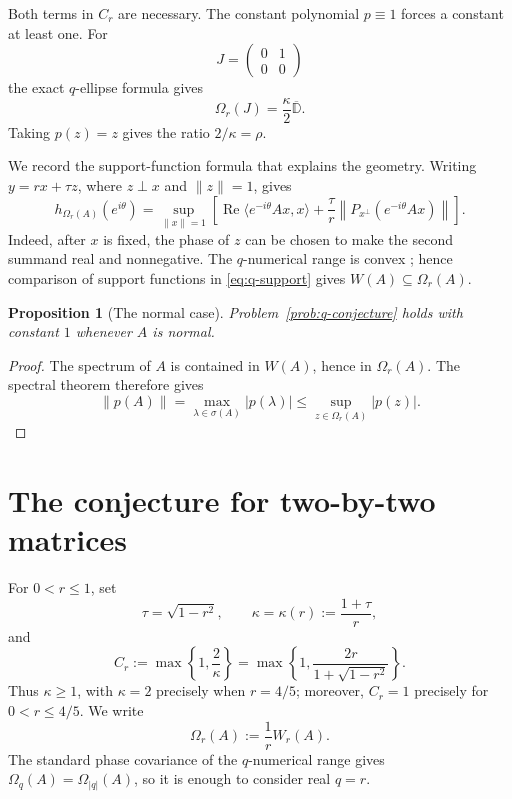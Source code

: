 \documentclass[11pt]{article}
\newtheorem{proposition}[theorem]{Proposition}
\theoremstyle{remark}
\newcommand{\D}{\mathbb D}
\newcommand{\RePart}{\operatorname{Re}}
\begin{document}
Both terms in \(C_r\) are necessary.  The constant polynomial
\(p\equiv1\) forces a constant at least one.  For
\[
 J=\begin{pmatrix}0&1\\0&0\end{pmatrix}
\]
the exact \(q\)-ellipse formula gives
\[
 \Omega_r(J)=\frac{\kappa}{2}\overline{\D}.
\]
Taking \(p(z)=z\) gives the ratio \(2/\kappa=\rho\).

We record the support-function formula that explains the geometry.
Writing \(y=rx+\tau z\), where \(z\perp x\) and \(\|z\|=1\), gives
\begin{equation}
\label{eq:q-support}
 h_{\Omega_r(A)}(e^{i\theta})
 =
 \sup_{\|x\|=1}
 \left[
  \RePart\langle e^{-i\theta}Ax,x\rangle
  +\frac{\tau}{r}
   \left\|P_{x^\perp}(e^{-i\theta}Ax)\right\|
 \right].
\end{equation}
Indeed, after \(x\) is fixed, the phase of \(z\) can be chosen to
make the second summand real and nonnegative.  The \(q\)-numerical
range is convex \cite{LiMehtaRodman1994}; hence comparison of support
functions in \eqref{eq:q-support} gives
\(W(A)\subseteq\Omega_r(A)\).

\begin{proposition}[The normal case]
\label{prop:normal}
Problem~\ref{prob:q-conjecture} holds with constant \(1\) whenever
\(A\) is normal.
\end{proposition}

\begin{proof}
The spectrum of \(A\) is contained in \(W(A)\), hence in
\(\Omega_r(A)\).  The spectral theorem therefore gives
\[
 \|p(A)\|=\max_{\lambda\in\sigma(A)}|p(\lambda)|
 \leq\sup_{z\in\Omega_r(A)}|p(z)|.
\]
\end{proof}

\section{The conjecture for two-by-two matrices}
\label{sec:q-two-by-two}

For \(0<r\leq 1\), set
\[
  \tau=\sqrt{1-r^{2}},\qquad
  \kappa=\kappa(r):=\frac{1+\tau}{r},
\]
and
\[
  C_r:=\max\left\{1,\frac{2}{\kappa}\right\}
  =\max\left\{1,\frac{2r}{1+\sqrt{1-r^{2}}}\right\}.
\]
Thus \(\kappa\geq 1\), with \(\kappa=2\) precisely when \(r=4/5\);
moreover, \(C_r=1\) precisely for \(0<r\leq4/5\).  We write
\[
  \Omega_r(A):=\frac{1}{r}W_r(A).
\]
The standard phase covariance of the \(q\)-numerical range gives
\(\Omega_q(A)=\Omega_{|q|}(A)\), so it is enough to consider real
\(q=r\).
\end{document}
